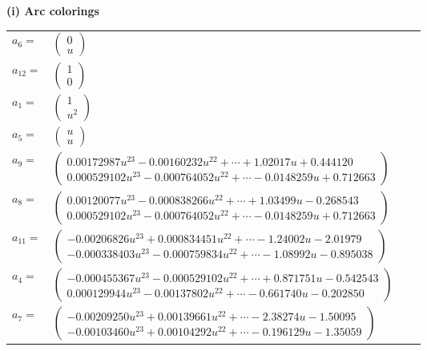 \documentclass[1p]{elsarticle_modified}
\theoremstyle{definition}
\begin{document}
\flushleft \textbf{(i) Arc colorings}\\
\begin{tabular}{m{7pt} m{180pt} m{7pt} m{180pt} }
\flushright $a_{6}=$&$\begin{pmatrix}0\\u\end{pmatrix}$ \\
\flushright $a_{12}=$&$\begin{pmatrix}1\\0\end{pmatrix}$ \\
\flushright $a_{1}=$&$\begin{pmatrix}1\\u^2\end{pmatrix}$ \\
\flushright $a_{5}=$&$\begin{pmatrix}u\\u\end{pmatrix}$ \\
\flushright $a_{9}=$&$\begin{pmatrix}0.00172987 u^{23}-0.00160232 u^{22}+\cdots+1.02017 u+0.444120\\0.000529102 u^{23}-0.000764052 u^{22}+\cdots-0.0148259 u+0.712663\end{pmatrix}$ \\
\flushright $a_{8}=$&$\begin{pmatrix}0.00120077 u^{23}-0.000838266 u^{22}+\cdots+1.03499 u-0.268543\\0.000529102 u^{23}-0.000764052 u^{22}+\cdots-0.0148259 u+0.712663\end{pmatrix}$ \\
\flushright $a_{11}=$&$\begin{pmatrix}-0.00206826 u^{23}+0.000834451 u^{22}+\cdots-1.24002 u-2.01979\\-0.000338403 u^{23}-0.000759834 u^{22}+\cdots-1.08992 u-0.895038\end{pmatrix}$ \\
\flushright $a_{4}=$&$\begin{pmatrix}-0.000455367 u^{23}-0.000529102 u^{22}+\cdots+0.871751 u-0.542543\\0.000129944 u^{23}-0.00137802 u^{22}+\cdots-0.661740 u-0.202850\end{pmatrix}$ \\
\flushright $a_{7}=$&$\begin{pmatrix}-0.00209250 u^{23}+0.00139661 u^{22}+\cdots-2.38274 u-1.50095\\-0.00103460 u^{23}+0.00104292 u^{22}+\cdots-0.196129 u-1.35059\end{pmatrix}$ \\

\end{tabular}
\end{document}
